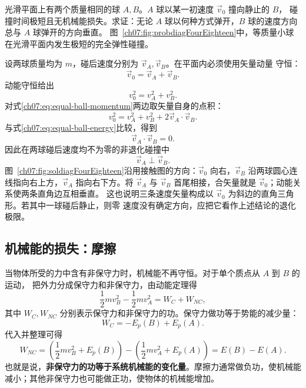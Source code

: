 {
\begin{origexamplebox}{}\label{ch07:ex:s12-4-18}
光滑平面上有两个质量相同的球 $A,B$。$A$ 球以某一初速度 $\vec v_0$ 撞向静止的 $B$，
碰撞时间极短且无机械能损失。求证：无论 $A$ 球以何种方式弹开，$B$ 球的速度方向总与
$A$ 球弹开的方向垂直。
图~\ref{ch07:fig:probdiagFourEighteen}中，等质量小球在光滑平面内发生极短的完全弹性碰撞。
\probdiagFourEighteen
\end{origexamplebox}

\begin{xesolution}
设两球质量均为 $m$，碰后速度分别为 $\vec v_A,\vec v_B$。在平面内必须使用矢量动量
守恒：
\begin{equation}\label{ch07:eq:equal-ball-momentum}
 \vec v_0=\vec v_A+\vec v_B.
\end{equation}
动能守恒给出
\begin{equation}\label{ch07:eq:equal-ball-energy}
 v_0^2=v_A^2+v_B^2.
\end{equation}
对式\eqref{ch07:eq:equal-ball-momentum}两边取矢量自身的点积：
\[
 v_0^2=v_A^2+v_B^2+2\vec v_A\cdot\vec v_B.
\]
与式\eqref{ch07:eq:equal-ball-energy}比较，得到
\[
 \vec v_A\cdot\vec v_B=0.
\]
因此在两球碰后速度均不为零的非退化碰撞中
\[
 \boxed{\vec v_A\perp\vec v_B}.
\]
图~\ref{ch07:fig:soldiagFourEighteen}沿用接触图的方向：$\vec v_0$ 向右，$\vec v_B$ 沿两球圆心连线指向右上方，$\vec v_A$ 指向右下方。将 $\vec v_A$ 与 $\vec v_B$ 首尾相接，合矢量就是 $\vec v_0$；动能关系使两条直角边互相垂直。
\soldiagFourEighteen
这也说明三条速度矢量构成以 $\vec v_0$ 为斜边的直角三角形。若其中一球碰后静止，则零
速度没有确定方向，应把它看作上述结论的退化极限。
\end{xesolution}

\subsection{机械能的损失：摩擦}

当物体所受的力中含有非保守力时，机械能不再守恒。对于单个质点从 $A$ 到 $B$ 的运动，
把外力分成保守力和非保守力，由动能定理得
\begin{equation}
 \frac12mv_B^2-\frac12mv_A^2=W_C+W_{NC},
\end{equation}
其中 $W_C,W_{NC}$ 分别表示保守力和非保守力的功。保守力做功等于势能的减少量：
\begin{equation}
 W_C=-E_p(B)+E_p(A).
\end{equation}
代入并整理可得
\begin{equation}\label{ch07:eq:nonconservative-work}
 W_{NC}
 =\left(\frac12mv_B^2+E_p(B)\right)
  -\left(\frac12mv_A^2+E_p(A)\right)
 =E(B)-E(A).
\end{equation}
也就是说，\textbf{非保守力的功等于系统机械能的变化量}。摩擦力通常做负功，使机械能
减小；其他非保守力也可能做正功，使物体的机械能增加。

}
